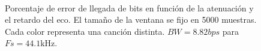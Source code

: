 \documentclass[conference]{IEEEtran}
\begin{document}
\begin{figure}[h]
    \centering
\\

  \caption{Porcentaje de error de llegada de bits en función de la atenuación y el retardo del eco. El tamaño de la ventana se fijo en 5000 muestras. Cada color representa una canción distinta. $BW=8.82bps$ para $Fs=44.1$kHz.}
  \label{fig:5000} 
\end{figure}
\end{document}
